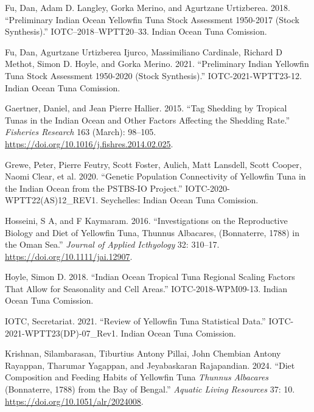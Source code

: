 \documentclass[
]{scrartcl}
\newlength{\cslhangindent}
\newenvironment{CSLReferences}[2] %
 {\begin{list}{}{%
  \setlength{\itemindent}{0pt}
  \setlength{\leftmargin}{0pt}
  \setlength{\parsep}{0pt}
  \ifodd #1
   \setlength{\leftmargin}{\cslhangindent}
   \setlength{\itemindent}{-1\cslhangindent}
  \fi
  \setlength{\itemsep}{#2\baselineskip}}}
 {\end{list}}
\begin{document}
\begin{CSLReferences}{1}{0}
Fu, Dan, Adam D. Langley, Gorka Merino, and Agurtzane Urtizberea. 2018.
{``Preliminary {Indian Ocean Yellowfin Tuna Stock Assessment} 1950-2017
({Stock Synthesis}).''} IOTC--2018--WPTT20--33. Indian Ocean Tuna
Comission.

Fu, Dan, Agurtzane Urtizberea Ijurco, Massimiliano Cardinale, Richard D
Methot, Simon D. Hoyle, and Gorka Merino. 2021. {``Preliminary {Indian
Yellowfin} Tuna Stock Assessment 1950-2020 ({Stock Synthesis}).''}
IOTC-2021-WPTT23-12. Indian Ocean Tuna Comission.

Gaertner, Daniel, and Jean Pierre Hallier. 2015. {``Tag Shedding by
Tropical Tunas in the {Indian Ocean} and Other Factors Affecting the
Shedding Rate.''} \emph{Fisheries Research} 163 (March): 98--105.
\url{https://doi.org/10.1016/j.fishres.2014.02.025}.

Grewe, Peter, Pierre Feutry, Scott Foster, Aulich, Matt Lansdell, Scott
Cooper, Naomi Clear, et al. 2020. {``Genetic Population Connectivity of
Yellowfin Tuna in the {Indian Ocean} from the {PSTBS-IO Project}.''}
IOTC-2020-WPTT22(AS)12\_REV1. Seychelles: Indian Ocean Tuna Comission.

Hosseini, S A, and F Kaymaram. 2016. {``Investigations on the
Reproductive Biology and Diet of Yellowfin Tuna, {Thunnus} Albacares,
({Bonnaterre}, 1788) in the {Oman Sea}.''} \emph{Journal of Applied
Icthyology} 32: 310--17. \url{https://doi.org/10.1111/jai.12907}.

Hoyle, Simon D. 2018. {``Indian {Ocean} Tropical Tuna Regional Scaling
Factors That Allow for Seasonality and Cell Areas.''}
IOTC-2018-WPM09-13. Indian Ocean Tuna Comission.

IOTC, Secretariat. 2021. {``Review of {Yellowfin Tuna Statistical
Data}.''} IOTC-2021-WPTT23(DP)-07\_Rev1. Indian Ocean Tuna Comission.

Krishnan, Silambarasan, Tiburtius Antony Pillai, John Chembian Antony
Rayappan, Tharumar Yagappan, and Jeyabaskaran Rajapandian. 2024. {``Diet
Composition and Feeding Habits of Yellowfin Tuna {\emph{Thunnus}}{
\emph{Albacares}} ({Bonnaterre}, 1788) from the {Bay} of {Bengal}.''}
\emph{Aquatic Living Resources} 37: 10.
\url{https://doi.org/10.1051/alr/2024008}.


\end{CSLReferences}
\end{document}
